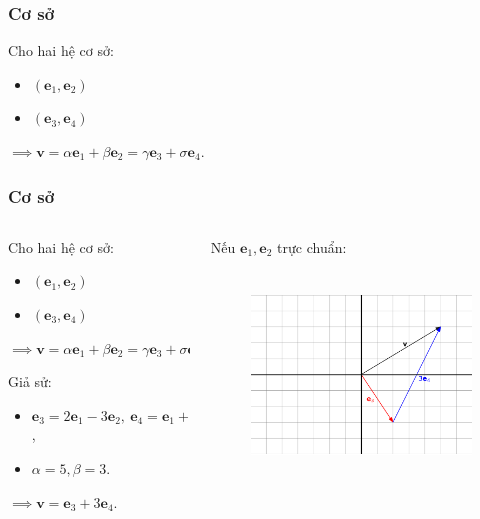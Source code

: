 \begin{frame}
    \frametitle{Cơ sở}
    Cho hai hệ cơ sở:
               \begin{itemize}
                  \item \((\mathbf{e}_1 ,\mathbf{e}_2)\) 
                \item \((\mathbf{e}_3 ,\mathbf{e}_4)\) 
                \end{itemize}
                \(\implies \mathbf{v}=\alpha\mathbf{e}_1 +\beta\mathbf{e}_2 =\gamma\mathbf{e}_3 +\sigma\mathbf{e}_{4}.\)
\end{frame}
\begin{frame}
    \frametitle{Cơ sở}
    \begin{columns}
        \begin{column}{0.45\textwidth}
            Cho hai hệ cơ sở:
               \begin{itemize}
                  \item \((\mathbf{e}_1 ,\mathbf{e}_2)\) 
                \item \((\mathbf{e}_3 ,\mathbf{e}_4)\) 
                \end{itemize}
                \(\implies \mathbf{v}=\alpha\mathbf{e}_1 +\beta\mathbf{e}_2 =\gamma\mathbf{e}_3 +\sigma\mathbf{e}_{4}.\)

                Giả sử: 
                \begin{itemize}
                \item \(\mathbf{e}_3 =2\mathbf{e}_1 -3\mathbf{e}_2 ,~\mathbf{e}_4 =\mathbf{e}_1 +2\mathbf{e}_2\),
                \item \(\alpha=5, \beta =3\).
                \end{itemize}
                \(\implies \mathbf{v}=\mathbf{e}_3 +3\mathbf{e}_4\).
        \end{column}
        \begin{column}{0.55\textwidth}
            Nếu \(\mathbf{e}_1 ,\mathbf{e}_2\) trực chuẩn:
            \begin{figure}[htps]
                \centering
                \includegraphics[width=7cm, height=5.5cm]{Slides/Figure/e3e4.png}
            \end{figure}
        \end{column}
    \end{columns}
\end{frame}
